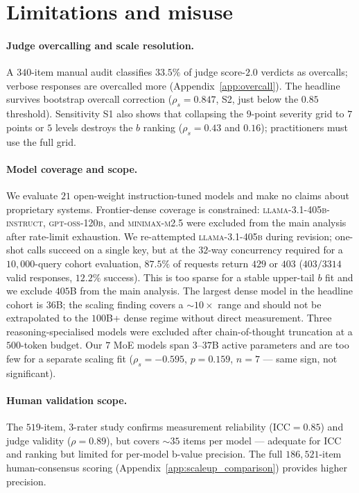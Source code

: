 \documentclass{article}
\newcommand{\sdi}{\ensuremath{b}}
\begin{document}
\section{Limitations and misuse}\label{sec:limitations}

\paragraph{Judge overcalling and scale resolution.} A $340$-item
manual audit classifies $33.5\%$ of judge score-$2.0$ verdicts as
overcalls; verbose responses are overcalled more (Appendix~\ref{app:overcall}).
The headline survives bootstrap overcall correction
($\rho_s = 0.847$, S2, just below the $0.85$ threshold). Sensitivity
S1 also shows that collapsing the $9$-point severity grid to $7$ points or
$5$ levels destroys the \sdi{} ranking ($\rho_s = 0.43$ and
$0.16$); practitioners must use the full grid.

\paragraph{Model coverage and scope.} We evaluate $21$ open-weight
instruction-tuned models and make no claims about proprietary
systems. Frontier-dense coverage is constrained:
\textsc{llama-3.1-405b-instruct}, \textsc{gpt-oss-120b}, and
\textsc{minimax-m2.5} were excluded from the main analysis after
rate-limit exhaustion. We re-attempted \textsc{llama-3.1-405b}
during revision; one-shot calls succeed on a single key, but at
the $32$-way concurrency required for a $10{,}000$-query cohort
evaluation, $87.5\%$ of requests return $429$ or $403$
($403/3314$ valid responses, $12.2\%$ success). This is too sparse
for a stable upper-tail $\sdi$ fit and we exclude $405$B from the
main analysis. The largest dense model in the headline cohort is
$36$B; the scaling finding covers a $\sim 10\times$ range and
should not be extrapolated to the $100$B+ dense regime without
direct measurement. Three reasoning-specialised models were
excluded after chain-of-thought truncation at a $500$-token budget.
Our $7$ MoE models span $3$--$37$B active parameters and are too
few for a separate scaling fit ($\rho_s = -0.595$, $p = 0.159$,
$n=7$ --- same sign, not significant).

\paragraph{Human validation scope.} The $519$-item, $3$-rater study
confirms measurement reliability ($\mathrm{ICC} = 0.85$) and judge
validity ($\rho = 0.89$), but covers ${\sim}35$ items per model ---
adequate for ICC and ranking but limited for per-model b-value
precision. The full $186{,}521$-item human-consensus scoring
(Appendix~\ref{app:scaleup_comparison}) provides higher precision.
\end{document}
